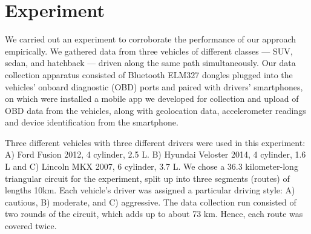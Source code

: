 \section{Experiment}

We carried out an experiment to corroborate the performance of our approach empirically. We gathered data from three vehicles of different classes --- SUV, sedan, and hatchback --- driven along the same path simultaneously. Our data collection apparatus consisted of Bluetooth ELM327 dongles plugged into the vehicles' onboard diagnostic (OBD) ports and paired with drivers' smartphones, on which were installed a mobile app we developed for collection and upload of OBD data from the vehicles, along with geolocation data, accelerometer readings and device identification from the smartphone.

Three different vehicles with three different drivers were used in this experiment: A) Ford Fusion 2012, 4 cylinder, 2.5 L. B) Hyundai Veloster 2014, 4 cylinder, 1.6 L and C) Lincoln MKX 2007, 6 cylinder, 3.7 L. We chose a 36.3 kilometer-long triangular circuit for the experiment, split up into three segments (routes) of lengths 10km. Each vehicle's driver was assigned a particular driving style: A) cautious, B) moderate, and C) aggressive. The data collection run consisted of two rounds of the circuit, which adds up to about 73 km. Hence, each route was covered twice.
